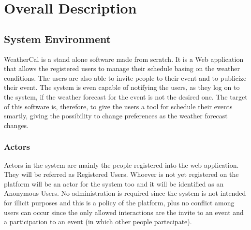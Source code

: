 \chapter{Overall Description} \label{cap:cap2}
\section{System Environment}
WeatherCal is a stand alone software made from scratch. It is a Web application that allows the registered users to manage their schedule basing on the weather conditions. The users are also able to invite people to their event and to publicize their event.  
The system is even capable of notifying the users, as they log on to the system, if the weather forecast for the event is not the desired one.
The target of this software is, therefore, to give the users a tool for schedule their events smartly, giving the possibility to change preferences as the weather forecast changes.
\subsection{Actors}
Actors in the system are mainly the people registered into the web application. They will be referred as Registered Users.
Whoever is not yet registered on the platform will be an actor for the system too and it will be identified as an Anonymous  Users.
No administration is required since the system is not intended for illicit purposes and this is a policy of the platform, plus no conflict among users can occur since the only allowed interactions are the invite to an event and a participation to an event (in which other people partecipate).
